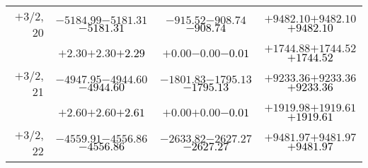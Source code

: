 \documentclass[compress]{beamer}
\begin{document}
\begin{frame}
{\begin{tabular}{r | c | c | c}
$+$3/2, 20 & $-5184.99$\hspace{0.1 cm}$-5181.31$\hspace{0.1 cm}\textcolor{black}{$-5181.31$} & $-915.52$\hspace{0.1 cm}$-908.74$\hspace{0.1 cm}\textcolor{black}{$-908.74$} & $+9482.10$\hspace{0.1 cm}$+9482.10$\hspace{0.1 cm}\textcolor{black}{$+9482.10$} \\
           & $+2.30$\hspace{0.1 cm}$+2.30$\hspace{0.1 cm}\textcolor{black}{$+2.29$} & $+0.00$\hspace{0.1 cm}$-0.00$\hspace{0.1 cm}\textcolor{black}{$-0.01$} & $+1744.88$\hspace{0.1 cm}$+1744.52$\hspace{0.1 cm}\textcolor{black}{$+1744.52$} \\
$+$3/2, 21 & $-4947.95$\hspace{0.1 cm}$-4944.60$\hspace{0.1 cm}\textcolor{black}{$-4944.60$} & $-1801.83$\hspace{0.1 cm}$-1795.13$\hspace{0.1 cm}\textcolor{black}{$-1795.13$} & $+9233.36$\hspace{0.1 cm}$+9233.36$\hspace{0.1 cm}\textcolor{black}{$+9233.36$} \\
           & $+2.60$\hspace{0.1 cm}$+2.60$\hspace{0.1 cm}\textcolor{black}{$+2.61$} & $+0.00$\hspace{0.1 cm}$+0.00$\hspace{0.1 cm}\textcolor{black}{$-0.01$} & $+1919.98$\hspace{0.1 cm}$+1919.61$\hspace{0.1 cm}\textcolor{black}{$+1919.61$} \\
$+$3/2, 22 & $-4559.91$\hspace{0.1 cm}$-4556.86$\hspace{0.1 cm}\textcolor{black}{$-4556.86$} & $-2633.82$\hspace{0.1 cm}$-2627.27$\hspace{0.1 cm}\textcolor{black}{$-2627.27$} & $+9481.97$\hspace{0.1 cm}$+9481.97$\hspace{0.1 cm}\textcolor{black}{$+9481.97$} \\

\end{tabular}}
\end{frame}
\end{document}
